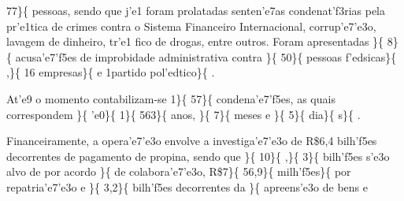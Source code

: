  77\}\{ \rtlch{}  \ltrch{}
 pessoas, sendo que j'e1 foram
prolatadas senten'e7as condenat'f3rias pela pr'e1tica de crimes contra o
Sistema Financeiro Internacional, corrup'e7'e3o, lavagem de dinheiro,
tr'e1 fico de drogas, entre outros. Foram apresentadas \}\{\rtlch{}
 \ltrch{}  8\}\{\rtlch{}  \ltrch{}
 acusa'e7'f5es de improbidade
administrativa contra \}\{\rtlch{}  \ltrch{} 
50\}\{\rtlch{}  \ltrch{} 
pessoas f'edsicas\}\{\rtlch{}  \ltrch{} 
,\}\{\rtlch{}  \ltrch{}  16
empresas\}\{\rtlch{}  \ltrch{}  e 1partido
pol'edtico\}\{\rtlch{}  \ltrch{}
 . \par At'e9 o momento contabilizam-se
1\}\{\rtlch{}  \ltrch{}  57\}\{\rtlch{} 
\ltrch{}  condena'e7'f5es, as quais
correspondem \}\{\rtlch{}  \ltrch{} 
'e0\}\{\rtlch{}  \ltrch{} 
1\}\{\rtlch{}  \ltrch{}  563\}\{\rtlch{}
 \ltrch{}  anos, \}\{\rtlch{}
 \ltrch{}  7\}\{\rtlch{}  \ltrch{}
 meses e \}\{\rtlch{} 
\ltrch{}  5\}\{\rtlch{}  \ltrch{}
 dia\}\{\rtlch{}  \ltrch{}
 s\}\{\rtlch{}  \ltrch{}
 . \par Financeiramente, a opera'e7'e3o
envolve a investiga'e7'e3o de R\$6,4 bilh'f5es decorrentes de pagamento
de propina, sendo que \}\{\rtlch{}  \ltrch{} 
10\}\{\rtlch{}  \ltrch{} 
,\}\{ \rtlch{}  \ltrch{}  3\}\{\rtlch{} 
\ltrch{}  bilh'f5es s'e3o alvo de por
acordo \}\{\rtlch{}  \ltrch{}  de
colabora'e7'e3o, R\$7\}\{\rtlch{}  \ltrch{} 
56,9\}\{\rtlch{}  \ltrch{} 
milh'f5es\}\{\rtlch{}  \ltrch{}
 por repatria'e7'e3o e \}\{\rtlch{}
 \ltrch{}  3,2\}\{\rtlch{}  \ltrch{}
 bilh'f5es decorrentes da
\}\{\rtlch{}  \ltrch{}  apreens'e3o de bens e
